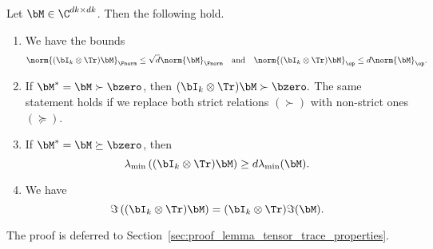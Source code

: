 \begin{lemma}
\label{lemma:tensor_trace_norm_bounds}
\label{lemma:tensor_trace_properties}
Let $\bM \in\C^{dk\times dk}$. Then the following hold.
\begin{enumerate}[(1.)]
    \item We have the bounds
\begin{align*}
    \norm{(\bI_k \otimes \Tr)\bM}_{\Fnorm} \le  \sqrt{d}\norm{\bM}_\Fnorm
    \quad\textrm{and}\quad
    \norm{(\bI_k \otimes \Tr)\bM}_\op \le  d\norm{\bM}_\op.
\end{align*}
\item If $\bM^*  =\bM  \succ  \bzero$, then $(\bI_k \otimes \Tr)\bM \succ\bzero.$
The same statement holds if we replace both strict relations 
$(\succ)$ with non-strict ones $(\succeq)$.
\item If $\bM^* = \bM \succeq \bzero$, then
\begin{equation*}
    \lambda_{\min}\left( (\bI_k \otimes \Tr)\bM \right) \ge d \lambda_{\min}(\bM).
\end{equation*}
\item We have
\begin{equation*}
   \Im\left(
   (\bI_k \otimes \Tr) \bM
   \right) =  (\bI_k \otimes \Tr) \Im(\bM).
\end{equation*}
\end{enumerate}
\end{lemma}
The proof is deferred to Section~\ref{sec:proof_lemma_tensor_trace_properties}.

